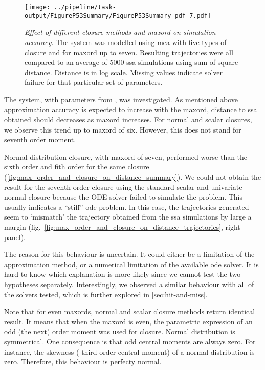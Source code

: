 \begin{figure}[t]
    \centering
    \texttt{[image: ../pipeline/task-output/FigureP53Summary/FigureP53Summary-pdf-7.pdf]}
    \caption{\emph{Effect of different closure methods and \gls{maxord} on simulation accuracy}. The \pft{} system was modelled using \gls{mea} with five types of closure and for \gls{maxord} up to seven.
Resulting trajectories were all compared to an average of 5000 \gls{ssa} simulations using sum of square distance.
Distance is in log scale. Missing values indicate solver failure for that particular set of parameters.}
    \label{fig:max_order_and_closure_on_distance_summary}
\end{figure}

The \pft{} system, with parameters from \cite{ale_general_2013}, was investigated.
As mentioned above approximation accuracy is expected to increase with the \gls{maxord}, \ie{} distance to \gls{ssa} obtained should decreases
 as \gls{maxord} increases.
For normal and scalar closures, we observe this trend up to \gls{maxord} of six.
However, this does not stand for seventh order moment.

Normal distribution closure, with \gls{maxord} of seven, performed worse than the sixth order and fith order for the same closure (\autoref{fig:max_order_and_closure_on_distance_summary}).
We could not obtain the result for the seventh order closure using the standard scalar and univariate normal closure
because the ODE solver failed to simulate the problem.
This usually indicates a ``stiff'' \gls{ode} problem\cite{hairer_solving_1996}.
In this case, the trajectories generated seem to `mismatch' the trajectory obtained from the \gls{ssa} simulations by
large a margin (fig.~\autoref{fig:max_order_and_closure_on_distance_trajectories}, right panel).

The reason for this behaviour is uncertain. It could either be a limitation of the approximation method, or a numerical limitation of the available \gls{ode} solver.
It is hard to know which explanation is more likely since we cannot test the two hypotheses separately.
Interestingly, we observed a similar behaviour with all of the solvers tested, which is further explored in \autoref{sec:hit-and-miss}.

Note that for even \glspl{maxord}, normal and scalar closure methods return identical result.
It means that when the \gls{maxord} is even,  the parametric expression of an odd (the next) order moment was used for closure.
Normal distribution is symmetrical. One consequence is that odd central moments are always zero.
For instance, the skewness (\ie{} third order central moment) of a normal distribution is zero.
Therefore, this behaviour is perfecty normal.



